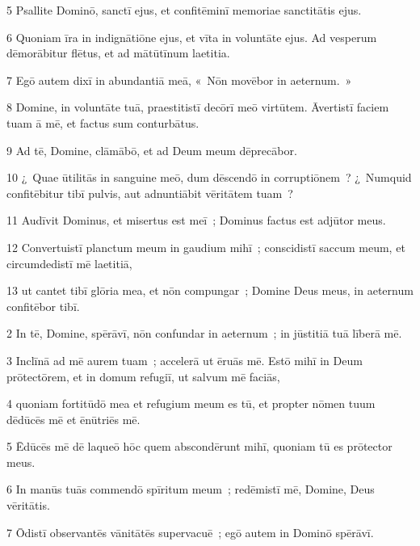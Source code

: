 \psalmVerse
  {\phantom{00}5}
  {Psallite Dominō, sanctī ejus, et confitēminī memoriae sanctitātis ejus.}


\psalmVerse
  {\phantom{00}6}
  {Quoniam īra in indignātiōne ejus, et vīta in voluntāte ejus. Ad vesperum dēmorābitur flētus, et ad mātūtīnum laetitia.}


\psalmVerse
  {\phantom{00}7}
  {Egō autem dixī in abundantiā meā, «~Nōn movēbor in aeternum.~»}


\psalmVerse
  {\phantom{00}8}
  {Domine, in voluntāte tuā, praestitistī decōrī meō virtūtem. Āvertistī faciem tuam ā mē, et factus sum conturbātus.}


\psalmVerse
  {\phantom{00}9}
  {Ad tē, Domine, clāmābō, et ad Deum meum dēprecābor.}


\psalmVerse
  {\phantom{0}10}
  {¿~Quae ūtilitās in sanguine meō, dum dēscendō in corruptiōnem~? ¿~Numquid confitēbitur tibī pulvis, aut adnuntiābit vēritātem tuam~?}


\psalmVerse
  {\phantom{0}11}
  {Audīvit Dominus, et misertus est meī~; Dominus factus est adjūtor meus.}


\psalmVerse
  {\phantom{0}12}
  {Convertuistī planctum meum in gaudium mihī~; conscidistī saccum meum, et circumdedistī mē laetitiā,}


\psalmVerse
  {\phantom{0}13}
  {ut cantet tibī glōria mea, et nōn compungar~; Domine Deus meus, in aeternum confitēbor tibī.}




\psalmVerse
  {\phantom{00}2}
  {In tē, Domine, spērāvī, nōn confundar in aeternum~; in jūstitiā tuā līberā mē.}


\psalmVerse
  {\phantom{00}3}
  {Inclīnā ad mē aurem tuam~; accelerā ut ēruās mē. Estō mihī in Deum prōtectōrem, et in domum refugiī, ut salvum mē faciās,}


\psalmVerse
  {\phantom{00}4}
  {quoniam fortitūdō mea et refugium meum es tū, et propter nōmen tuum dēdūcēs mē et ēnūtriēs mē.}


\psalmVerse
  {\phantom{00}5}
  {Ēdūcēs mē dē laqueō hōc quem abscondērunt mihī, quoniam tū es prōtector meus.}


\psalmVerse
  {\phantom{00}6}
  {In manūs tuās commendō spīritum meum~; redēmistī mē, Domine, Deus vēritātis.}


\psalmVerse
  {\phantom{00}7}
  {Ōdistī observantēs vānitātēs supervacuē~; egō autem in Dominō spērāvī.}


